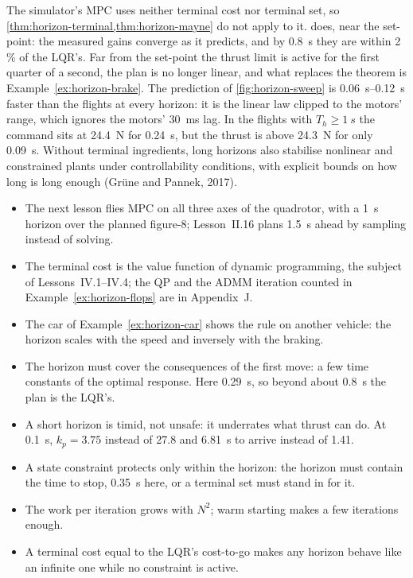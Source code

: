 The simulator's MPC uses neither terminal cost nor terminal set, so \cref{thm:horizon-terminal,thm:horizon-mayne} do not apply to it.  does, near the set-point: the measured gains converge as it predicts, and by \SI{0.8}{s} they are within 2\,\% of the LQR's. Far from the set-point the thrust limit is active for the first quarter of a second, the plan is no longer linear, and what replaces the theorem is Example~\ref{ex:horizon-brake}. The prediction of \cref{fig:horizon-sweep} is \SIrange{0.06}{0.12}{s} faster than the flights at every horizon: it is the linear law clipped to the motors' range, which ignores the motors' \SI{30}{ms} lag. In the flights with $T_h \ge \SI{1}{s}$ the command sits at \SI{24.4}{N} for \SI{0.24}{s}, but the thrust is above \SI{24.3}{N} for only \SI{0.09}{s}. Without terminal ingredients, long horizons also stabilise nonlinear and constrained plants under controllability conditions, with explicit bounds on how long is long enough (Grüne and Pannek, 2017).

\begin{lookahead}
\begin{itemize}[leftmargin=1.2em]
  \item The next lesson flies MPC on all three axes of the quadrotor, with a \SI{1}{s} horizon over the planned figure-8; Lesson~II.16 plans \SI{1.5}{s} ahead by sampling instead of solving.
  \item The terminal cost is the value function of dynamic programming, the subject of Lessons~IV.1--IV.4; the QP and the ADMM iteration counted in Example~\ref{ex:horizon-flops} are in Appendix~J.
  \item The car of Example~\ref{ex:horizon-car} shows the rule on another vehicle: the horizon scales with the speed and inversely with the braking.
\end{itemize}
\end{lookahead}

\begin{remember}
\begin{itemize}
  \item The horizon must cover the consequences of the first move: a few time constants of the optimal response. Here \SI{0.29}{s}, so beyond about \SI{0.8}{s} the plan is the LQR's.
  \item A short horizon is timid, not unsafe: it underrates what thrust can do. At \SI{0.1}{s}, $k_p = 3.75$ instead of 27.8 and \SI{6.81}{s} to arrive instead of 1.41.
  \item A state constraint protects only within the horizon: the horizon must contain the time to stop, \SI{0.35}{s} here, or a terminal set must stand in for it.
  \item The work per iteration grows with $N^2$; warm starting makes a few iterations enough.
  \item A terminal cost equal to the LQR's cost-to-go makes any horizon behave like an infinite one while no constraint is active.
\end{itemize}
\end{remember}


